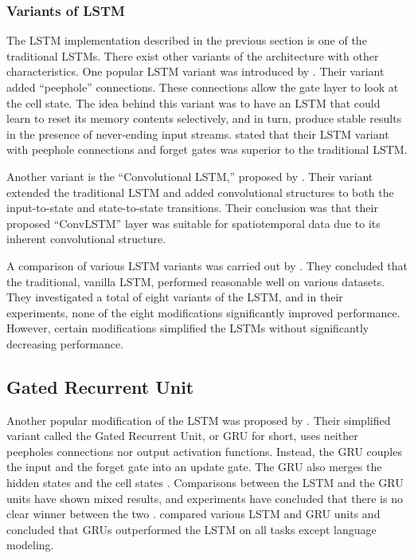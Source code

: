 \subsubsection{Variants of LSTM}
The LSTM implementation described in the previous section is one of the traditional LSTMs. There exist other variants of the architecture with other characteristics. One popular LSTM variant was introduced by \cite{gers2001lstm}. Their variant added ``peephole'' connections. These connections allow the gate layer to look at the cell state. The idea behind this variant was to have an LSTM that could learn to reset its memory contents selectively, and in turn, produce stable results in the presence of never-ending input streams. \cite{gers2001lstm} stated that their LSTM variant with peephole connections and forget gates was superior to the traditional LSTM. 

Another variant is the ``Convolutional LSTM,'' proposed by \cite{xingjian2015convolutional}. Their variant extended the traditional LSTM and added convolutional structures to both the input-to-state and state-to-state transitions. Their conclusion was that their proposed ``ConvLSTM'' layer was suitable for spatiotemporal data due to its inherent convolutional structure.

A comparison of various LSTM variants was carried out by \cite{greff2016lstm}. They concluded that the traditional, vanilla LSTM, performed reasonable well on various datasets. They investigated a total of eight variants of the LSTM, and in their experiments, none of the eight modifications significantly improved performance. However, certain modifications simplified the LSTMs without significantly decreasing performance. 

\subsection{Gated Recurrent Unit}
Another popular modification of the LSTM was proposed by \cite{chung2014empirical}. Their simplified variant called the Gated Recurrent Unit, or GRU for short, uses neither peepholes connections nor output activation functions. Instead, the GRU couples the input and the forget gate into an update gate. The GRU also merges the hidden states and the cell states \citep{greff2016lstm, chung2014empirical}. Comparisons between the LSTM and the GRU units have shown mixed results, and experiments have concluded that there is no clear winner between the two \citep{greff2016lstm, chung2014empirical}. \cite{jozefowicz2015empirical} compared various LSTM and GRU units and concluded that GRUs outperformed the LSTM on all tasks except language modeling.

